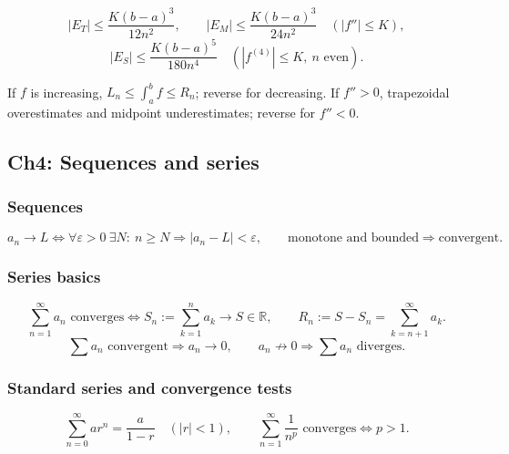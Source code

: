 \begin{keyformula}[title={Numerical Error Bounds}]
\[
|E_T|\le \frac{K(b-a)^3}{12n^2},
\qquad
|E_M|\le \frac{K(b-a)^3}{24n^2}
\quad (|f''|\le K),
\]
\[
|E_S|\le \frac{K(b-a)^5}{180n^4}
\quad (|f^{(4)}|\le K,\ n\text{ even}).
\]
\end{keyformula}

\begin{examtip}
If \(f\) is increasing, \(L_n\le \int_a^b f\le R_n\); reverse for decreasing.
If \(f''>0\), trapezoidal overestimates and midpoint underestimates; reverse
for \(f''<0\).
\end{examtip}

\subsection{Ch4: Sequences and series}

\subsubsection{Sequences}
\begin{keyformula}[title={Sequence Convergence and Monotone Convergence}]
\[
a_n\to L\iff \forall\varepsilon>0\ \exists N:\ n\ge N\Rightarrow |a_n-L|<\varepsilon,
\qquad
\text{monotone and bounded}\Rightarrow\text{convergent}.
\]
\end{keyformula}

\subsubsection{Series basics}
\begin{keyformula}[title={Partial Sums, Remainders, and the $n$th-Term Test}]
\[
\sum_{n=1}^{\infty}a_n\text{ converges}\iff
S_n:=\sum_{k=1}^n a_k\to S\in\mathbb R,
\qquad
R_n:=S-S_n=\sum_{k=n+1}^{\infty}a_k.
\]
\[
\sum a_n\text{ convergent}\Rightarrow a_n\to0,
\qquad
a_n\not\to0\Rightarrow \sum a_n\text{ diverges}.
\]
\end{keyformula}

\subsubsection{Standard series and convergence tests}
\begin{keyformula}[title={Geometric and $p$-Series}]
\[
\sum_{n=0}^{\infty}ar^n=\frac{a}{1-r}\quad(|r|<1),
\qquad
\sum_{n=1}^{\infty}\frac{1}{n^p}\text{ converges}\Longleftrightarrow p>1.
\]
\end{keyformula}


